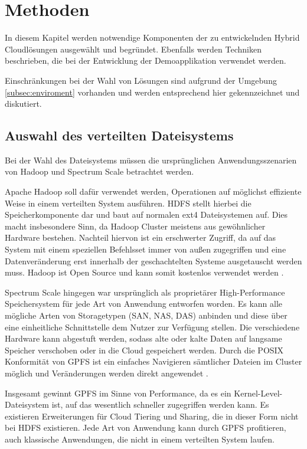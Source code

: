 \chapter{Methoden}\label{ch:methods}

In diesem Kapitel werden notwendige Komponenten der zu entwickelnden Hybrid Cloudlösungen ausgewählt und begründet. Ebenfalls werden Techniken beschrieben, die bei der Entwicklung der Demoapplikation verwendet werden. 

Einschränkungen bei der Wahl von Lösungen sind aufgrund der Umgebung \ref{subsec:enviroment} vorhanden und werden entsprechend hier gekennzeichnet und diskutiert.

\section{Auswahl des verteilten Dateisystems}
Bei der Wahl des Dateisystems müssen die ursprünglichen Anwendungsszenarien von Hadoop und Spectrum Scale betrachtet werden. 

Apache Hadoop soll dafür verwendet werden, Operationen auf möglichst effiziente Weise in einem verteilten System ausführen. \acs{HDFS} stellt hierbei die Speicherkomponente dar und baut auf normalen ext4 Dateisystemen auf. Dies macht insbesondere Sinn, da Hadoop Cluster meistens aus gewöhnlicher Hardware bestehen. Nachteil hiervon ist ein erschwerter Zugriff, da auf das System mit einem speziellen Befehlsset immer von außen zugegriffen und eine Datenveränderung erst innerhalb der geschachtelten Systeme ausgetauscht werden muss.
Hadoop ist Open Source und kann somit kostenlos verwendet werden \parencite{snowflake.2016}. 

Spectrum Scale hingegen war ursprünglich als proprietärer High-Performance Speichersystem für jede Art von Anwendung entworfen worden. Es kann alle mögliche Arten von Storagetypen (\acs{SAN}, \acs{NAS}, \acs{DAS}) anbinden und diese über eine einheitliche Schnittstelle dem Nutzer zur Verfügung stellen. Die verschiedene Hardware kann abgestuft werden, sodass alte oder kalte Daten auf langsame Speicher verschoben oder in die Cloud gespeichert werden.  Durch die \gls{POSIX} Konformität von \acs{GPFS} ist ein einfaches Navigieren sämtlicher Dateien im Cluster möglich und Veränderungen werden direkt angewendet \parencite{snowflake.2016}.

Insgesamt gewinnt \acs{GPFS} im Sinne von Performance, da es ein Kernel-Level-Dateisystem ist, auf das wesentlich schneller zugegriffen werden kann. Es existieren Erweiterungen für Cloud Tiering und Sharing, die in dieser Form nicht bei HDFS existieren. Jede Art von Anwendung kann durch \acs{GPFS} profitieren, auch klassische Anwendungen, die nicht in einem verteilten System laufen.

